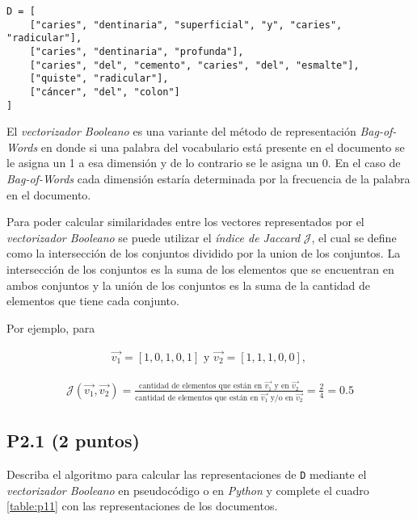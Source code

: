 \documentclass{article}
\begin{document}
\begin{verbatim}
D = [
    ["caries", "dentinaria", "superficial", "y", "caries", "radicular"],
    ["caries", "dentinaria", "profunda"],
    ["caries", "del", "cemento", "caries", "del", "esmalte"],
    ["quiste", "radicular"],
    ["cáncer", "del", "colon"]
]
\end{verbatim}

El \textit{vectorizador Booleano} es una variante del método de representación \textit{Bag-of-Words} en donde si una palabra del vocabulario está presente en el documento se le asigna un 1 a esa dimensión y de lo contrario se le asigna un 0. En el caso de \textit{Bag-of-Words} cada dimensión estaría determinada por la frecuencia de la palabra en el documento.

Para poder calcular similaridades entre los vectores representados por el \textit{vectorizador Booleano} se puede utilizar el \textit{índice de Jaccard} $\mathcal{J}$, el cual se define como la intersección de los conjuntos dividido por la union de los conjuntos. La intersección de los conjuntos es la suma de los elementos que se encuentran en ambos conjuntos y la unión de los conjuntos es la suma de la cantidad de elementos que tiene cada conjunto.

Por ejemplo, para

\begin{align*}
	\vec{v_1} = [1,0,1,0,1] 
	\textrm{ y }            
	\vec{v_2} = [1,1,1,0,0] 
	\textrm{, }             
\end{align*}

\begin{align*}
	\mathcal{J}(\vec{v_1},\vec{v_2}) = \frac{\textrm{cantidad de elementos que están en } \vec{v_1} \textrm{ y en } \vec{v_2}}{\textrm{cantidad de elementos que están en } \vec{v_1} \textrm{ y/o en } \vec{v_2}} = \frac{2}{4} = 0.5 
\end{align*}

\newpage

\subsection*{P2.1 (2 puntos)}

Describa el algoritmo para calcular las representaciones de \texttt{D} mediante el \textit{vectorizador Booleano} en pseudocódigo o en \textit{Python} y complete el cuadro \ref{table:p11} con las representaciones de los documentos.
\end{document}
